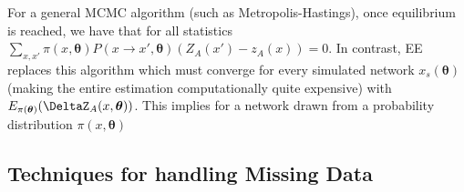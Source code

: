 For a general MCMC algorithm (such as Metropolis-Hastings), once equilibrium is reached, we have that for all statistics $\sum_{x,x'}\pi(x, \boldsymbol{\theta})P(x \rightarrow x', \boldsymbol{\theta})(Z_A(x') - z_A(x)) = 0$. In contrast, EE replaces this algorithm which must converge for every simulated network $x_s(\boldsymbol{\theta})$ (making the entire estimation computationally quite expensive) with $E_{\pi(\boldsymbol{\theta})}(\DeltaZ_A(x, \boldsymbol{\theta}))$. This implies for a network drawn from a probability distribution $\pi(x, \boldsymbol{\theta})$

\subsection{Techniques for handling Missing Data}